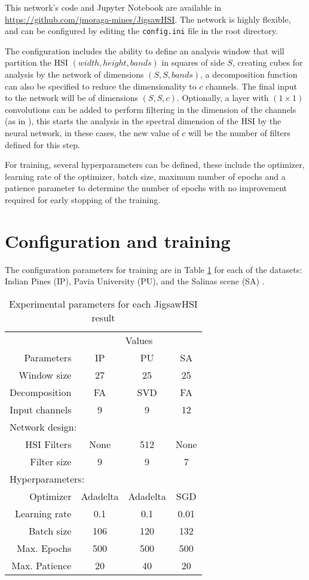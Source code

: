 \documentclass[lettersize, journal]{IEEEtran}
\begin{document}
 This network's code and Jupyter Notebook are available in \url{https://github.com/jmoraga-mines/JigsawHSI}. The network is highly flexible, and can be configured by editing the {\texttt{config.ini}} file in the root directory.  

The configuration includes the ability to define an analysis window that will partition the HSI $(width, height, bands)$ in squares of side $S$, creating cubes for analysis by the network of dimensions $(S, S, bands)$, a decomposition function can also be specified to reduce the dimensionality to $c$ channels. The final input to the network will be of dimensions $(S, S, c)$. Optionally, a layer with $(1 \times 1)$ convolutions can be added to perform filtering in the dimension of the channels (as in \cite{lin_network_2014}), this starts the analysis in the spectral dimension of the HSI by the neural network, in these cases, the new value of $c$ will be the number of filters defined for this step. 

For training, several hyperparameters can be defined, these include the optimizer, learning rate of the optimizer, batch size, maximum number of epochs and a patience parameter to determine the number of epochs with no improvement required for early stopping of the training.

\section{Configuration and training}
The configuration parameters for training are in Table \ref{tab:parameters} for each of the datasets: Indian Pines (IP), Pavia University (PU), and the Salinas scene (SA) .

\begin{table}[htb]
    \centering
    \caption{Experimental parameters for each JigsawHSI result}
    \label{tab:parameters}
    \begin{tabular}{r|c|c|c}
    \toprule
         & \multicolumn{3}{c}{Values}   \\
        Parameters \hfill & IP & PU & SA   \\
        \midrule
        Window size & 27 & 25 & 25   \\
        Decomposition & FA & SVD & FA   \\
        Input channels & 9 & 9 & 12   \\
       \multicolumn{4}{l}{Network design:}  \hfill \\
        HSI Filters & None & 512 & None   \\
        Filter size & 9 & 9 & 7   \\
        \multicolumn{4}{l}{Hyperparameters:} \hfill  \\
        Optimizer & Adadelta & Adadelta & SGD   \\
        Learning rate & 0.1 & 0.1 & 0.01   \\
        Batch size & 106 & 120 & 132   \\
        Max. Epochs & 500 & 500 & 500   \\
        Max. Patience & 20 & 40 & 20   \\
    \bottomrule
    \end{tabular}
\end{table}
\end{document}
